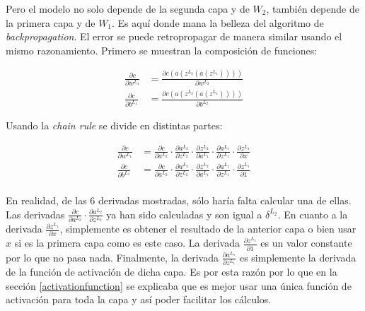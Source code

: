 Pero el modelo no solo depende de la segunda capa y de $W_2$, también depende de la primera capa y de $W_1$. Es aquí donde mana la belleza del algoritmo de \textit{backpropagation}. El error se puede retropropagar de manera similar usando el mismo razonamiento. Primero se muestran la composición de funciones:

\begin{equation}
\begin{split}
    \frac{\partial c}{\partial w^{L_1}} &= \frac{\partial c(a(z^{L_2}(a(z^{L_1}))))}{\partial w^{L_2}} \\
    \frac{\partial c}{\partial b^{L_1}} &= \frac{\partial c(a(z^{L_2}(a(z^{L_1}))))}{\partial b^{L_2}} 
    \label{eqn:backpropagationsimplenetworklayer2}
\end{split}
\end{equation}

Usando la \textit{chain rule} se divide en distintas partes:

\begin{equation}
\begin{split}
     \frac{\partial c}{\partial w^{L_1}} &= \frac{\partial c}{\partial a^{L_2}} \cdot \frac{\partial a^{L_2}}{\partial z^{L_2}} \cdot \frac{\partial z^{L_2}}{\partial a^{L_1}} \cdot \frac{\partial a^{L_1}}{\partial z^{L_1}} \cdot \frac{\partial z^{L_1}}{\partial x} \\
     \frac{\partial c}{\partial b^{L_1}} &= \frac{\partial c}{\partial a^{L_2}} \cdot \frac{\partial a^{L_2}}{\partial z^{L_2}} \cdot \frac{\partial z^{L_2}}{\partial a^{L_1}} \cdot \frac{\partial a^{L_1}}{\partial z^{L_1}} \cdot \frac{\partial z^{L_1}}{\partial 1} \\
\end{split}
 \label{eqn:backpropagationlayer1}
\end{equation}


En realidad, de las $6$ derivadas mostradas, sólo haría falta calcular una de ellas. Las derivadas $\frac{\partial c}{\partial a^{L_2}} \cdot \frac{\partial a^{L_2}}{\partial z^{L_2}} $ ya han sido calculadas y son igual a $\delta^{L_2}$. En cuanto a la derivada $\frac{\partial z^{L_1}}{\partial x}$, simplemente es obtener el resultado de la anterior capa o bien usar $x$ si es la primera capa como es este caso. La derivada $\frac{\partial z^{L_1}}{\partial 1}$ es un valor constante por lo que no pasa nada. Finalmente, la derivada $\frac{\partial a^{L_1}}{\partial z^{L_1}}$ es simplemente la derivada de la función de activación de dicha capa. Es por esta razón por lo que en la sección \ref{activationfunction} se explicaba que es mejor usar una única función de activación para toda la capa y así poder facilitar los cálculos.
\newline

